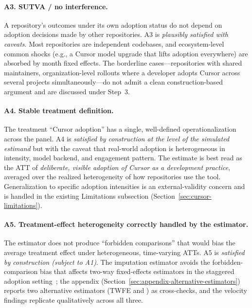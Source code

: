 \paragraph{A3. SUTVA / no interference.}
A repository's outcomes under its own adoption status do not depend on adoption decisions made by other repositories.
A3 is \emph{plausibly satisfied with caveats}.
Most repositories are independent codebases, and ecosystem-level common shocks (e.g., a Cursor model upgrade that lifts adoption everywhere) are absorbed by month fixed effects.
The borderline cases---repositories with shared maintainers, organization-level rollouts where a developer adopts Cursor across several projects simultaneously---do not admit a clean construction-based argument and are discussed under Step~3.

\paragraph{A4. Stable treatment definition.}
The treatment ``Cursor adoption'' has a single, well-defined operationalization across the panel.
A4 is \emph{satisfied by construction at the level of the simulated estimand} but with the caveat that real-world adoption is heterogeneous in intensity, model backend, and engagement pattern.
The estimate is best read as the ATT of \emph{deliberate, visible adoption of Cursor as a development practice}, averaged over the realized heterogeneity of how repositories use the tool.
Generalization to specific adoption intensities is an external-validity concern and is handled in the existing Limitations subsection (Section~\ref{sec:cursor-limitations}).

\paragraph{A5. Treatment-effect heterogeneity correctly handled by the estimator.}
The estimator does not produce ``forbidden comparisons'' that would bias the average treatment effect under heterogeneous, time-varying ATTs.
A5 is \emph{satisfied by construction (subject to A1)}.
The \citet{borusyak2024revisiting} imputation estimator avoids the forbidden-comparison bias that affects two-way fixed-effects estimators in the staggered adoption setting~\cite{borusyak2024revisiting, callaway2021difference}; the appendix (Section~\ref{sec:appendix-alternative-estimators}) reports two alternative estimators (TWFE and \citet{callaway2021difference}) as cross-checks, and the velocity findings replicate qualitatively across all three.

